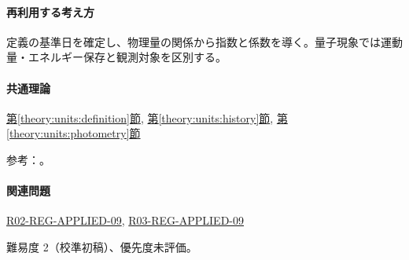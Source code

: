 \paragraph{再利用する考え方} 定義の基準日を確定し、物理量の関係から指数と係数を導く。量子現象では運動量・エネルギー保存と観測対象を区別する。

\paragraph{共通理論} \hyperref[theory:units:definition]{第\ref*{theory:units:definition}節}, \hyperref[theory:units:history]{第\ref*{theory:units:history}節}, \hyperref[theory:units:photometry]{第\ref*{theory:units:photometry}節}

\par 参考：\cite{si_cgpm2018,si_brochure9}。

\paragraph{関連問題} \hyperref[q:r02-reg-applied-09]{R02-REG-APPLIED-09}, \hyperref[q:r03-reg-applied-09]{R03-REG-APPLIED-09}

\par 難易度 2（校準初稿）、優先度未評価。
